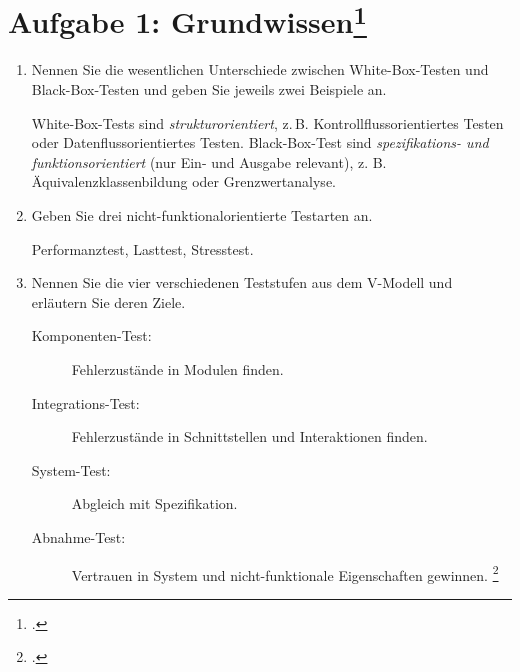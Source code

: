 \documentclass{lehramt-informatik-haupt}
\begin{document}
\section{Aufgabe 1: Grundwissen\footcite{sosy:ab:7}}

\begin{enumerate}


\item Nennen Sie die wesentlichen Unterschiede zwischen White-Box-Testen
und Black-Box-Testen und geben Sie jeweils zwei Beispiele an.

\begin{antwort}
White-Box-Tests sind \emph{strukturorientiert}, z.\,B.
Kontrollflussorientiertes Testen oder Datenflussorientiertes Testen.
Black-Box-Test sind \emph{spe\-zifi\-kations- und funktionsorientiert} (nur
Ein- und Ausgabe relevant), z. B. Äquivalenzklassenbildung oder
Grenzwertanalyse.
\end{antwort}


\item Geben Sie drei nicht-funktionalorientierte Testarten an.

\begin{antwort}
Performanztest, Lasttest, Stresstest.
\end{antwort}


\item Nennen Sie die vier verschiedenen Teststufen aus dem V-Modell und
erläutern Sie deren Ziele.

\begin{antwort}
\begin{description}
\item[Komponenten-Test:]
Fehlerzustände in Modulen finden.

\item[Integrations-Test:]
Fehlerzustände in Schnittstellen und Interaktionen finden.

\item[System-Test:]
Abgleich mit Spezifikation.

\item[Abnahme-Test:]
Vertrauen in System und nicht-funktionale Eigenschaften gewinnen.
\footcite[Seite 50, Abbildung 3.2]{schatten}
\end{description}
\end{antwort}



\end{enumerate}
\end{document}

